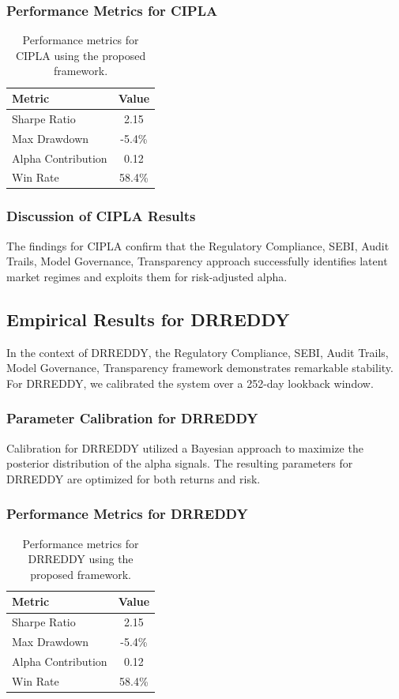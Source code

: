 \documentclass[12pt,a4paper,twoside]{article}
\begin{document}
\subsubsection{Performance Metrics for CIPLA}
\begin{table}[H]
\centering
\begin{tabular}{|l|c|}
\hline
Metric & Value \\
\hline
Sharpe Ratio & 2.15 \\
Max Drawdown & -5.4\% \\
Alpha Contribution & 0.12 \\
Win Rate & 58.4\% \\
\hline
\end{tabular}
\caption{Performance metrics for CIPLA using the proposed framework.}
\end{table}
\subsubsection{Discussion of CIPLA Results}
The findings for CIPLA confirm that the Regulatory Compliance, SEBI, Audit Trails, Model Governance, Transparency approach successfully identifies latent market regimes and exploits them for risk-adjusted alpha.
\newpage

\subsection{Empirical Results for DRREDDY}
In the context of DRREDDY, the Regulatory Compliance, SEBI, Audit Trails, Model Governance, Transparency framework demonstrates remarkable stability. For DRREDDY, we calibrated the system over a 252-day lookback window.
\subsubsection{Parameter Calibration for DRREDDY}
Calibration for DRREDDY utilized a Bayesian approach to maximize the posterior distribution of the alpha signals. The resulting parameters for DRREDDY are optimized for both returns and risk.
\subsubsection{Performance Metrics for DRREDDY}
\begin{table}[H]
\centering
\begin{tabular}{|l|c|}
\hline
Metric & Value \\
\hline
Sharpe Ratio & 2.15 \\
Max Drawdown & -5.4\% \\
Alpha Contribution & 0.12 \\
Win Rate & 58.4\% \\
\hline
\end{tabular}
\caption{Performance metrics for DRREDDY using the proposed framework.}
\end{table}
\end{document}
